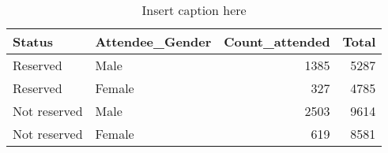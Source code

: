 \begin{table}

\caption{Insert caption here}
\centering
\begin{tabular}[t]{llrr}
\toprule
Status & Attendee\_Gender & Count\_attended & Total\\
\midrule
Reserved & Male & 1385 & 5287\\
Reserved & Female & 327 & 4785\\
Not reserved & Male & 2503 & 9614\\
Not reserved & Female & 619 & 8581\\
\bottomrule
\end{tabular}
\end{table}